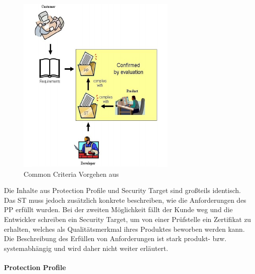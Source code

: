 \documentclass[11pt,a4paper]{report}
\begin{document}
\begin{figure}[htbp]
\centering
\includegraphics[scale=1.8]{images/cc_prozess.pdf}
\caption[]{Common Criteria Vorgehen aus \cite{bsi_ccguide}}
\label{fig:cc_prozess}
\end{figure}

Die Inhalte aus Protection Profile und Security Target sind großteils identisch. Das ST muss jedoch zusätzlich konkrete beschreiben, wie die Anforderungen des PP erfüllt wurden. Bei der zweiten Möglichkeit fällt der Kunde weg und die Entwickler schreiben ein Security Target, um von einer Prüfstelle ein Zertifikat zu erhalten, welches als Qualitätsmerkmal ihres Produktes beworben werden kann. Die Beschreibung des Erfüllen von Anforderungen ist stark produkt- bzw. systemabhängig und wird daher nicht weiter erläutert.

\paragraph{Protection Profile}
\end{document}
